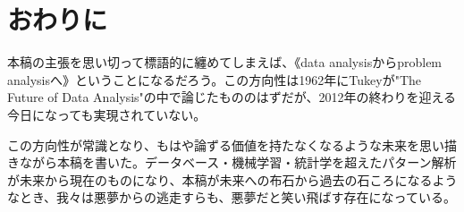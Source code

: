 \section{おわりに}
本稿の主張を思い切って標語的に纏めてしまえば、《data analysisからproblem analysisへ》ということになるだろう。この方向性は1962年にTukeyが"The Future of Data Analysis"の中で論じたもののはずだが、2012年の終わりを迎える今日になっても実現されていない。

この方向性が常識となり、もはや論ずる価値を持たなくなるような未来を思い描きながら本稿を書いた。データベース・機械学習・統計学を超えたパターン解析が未来から現在のものになり、本稿が未来への布石から過去の石ころになるようなとき、我々は悪夢からの逃走すらも、悪夢だと笑い飛ばす存在になっている。

